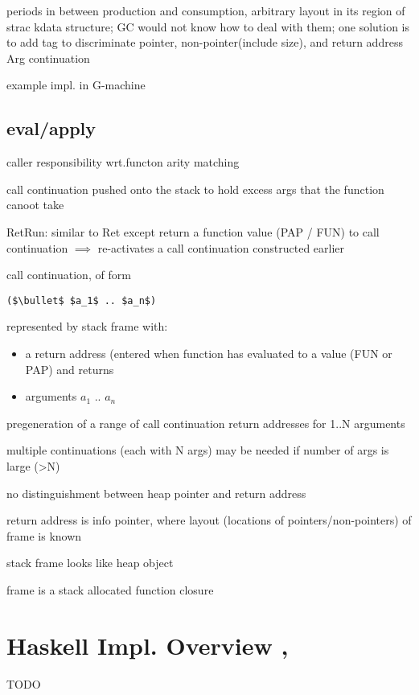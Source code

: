 \documentclass[8pt]{extarticle}
\begin{document}
\begin{multicols*}{2}
periods in between production and consumption, arbitrary layout in its region of strac kdata structure; GC would not know how to deal with them; one solution is to add tag to discriminate pointer, non-pointer(include size), and return address Arg continuation

example impl. in G-machine

\subsection{eval/apply}

caller responsibility wrt.functon arity matching

call continuation pushed onto the stack to hold excess args that the function canoot take

RetRun: similar to Ret except return a function value (PAP / FUN) to call continuation $\implies$ re-activates a call continuation constructed earlier

call continuation, of form
\begin{lstlisting}
($\bullet$ $a_1$ .. $a_n$)
\end{lstlisting}
represented by stack frame with:
\begin{itemize}
\item a return address (entered when function has evaluated to a value (FUN or PAP) and returns
\item arguments $a_1$ .. $a_n$
\end{itemize}

pregeneration of a range of call continuation return addresses for 1..N arguments

multiple continuations (each with N args)  may be needed if number of args is large (>N)

no distinguishment between heap pointer and return address

return address is info pointer, where layout (locations of pointers/non-pointers) of frame is known

stack frame looks like heap object

frame is a stack allocated function closure

\vfill\null
\columnbreak

\section{Haskell Impl. Overview \cite{wiki_STG}, \cite{terei2011}}

TODO


\end{multicols*}
\end{document}
